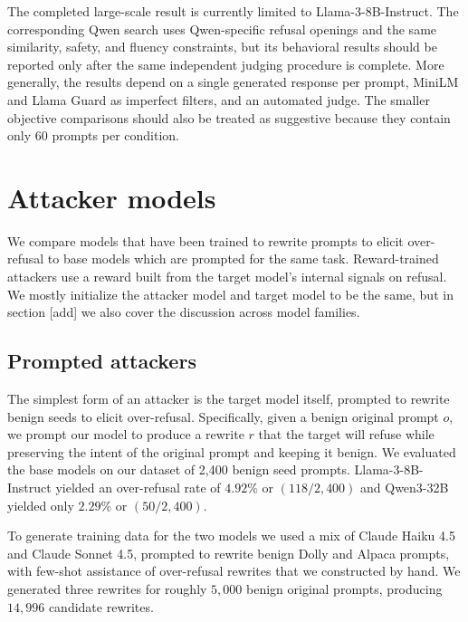 \documentclass{article}
\begin{document}
The completed large-scale result is currently limited to Llama-3-8B-Instruct. The corresponding Qwen search uses Qwen-specific refusal openings and the same similarity, safety, and fluency constraints, but its behavioral results should be reported only after the same independent judging procedure is complete. More generally, the results depend on a single generated response per prompt, MiniLM and Llama Guard as imperfect filters, and an automated judge. The smaller objective comparisons should also be treated as suggestive because they contain only 60 prompts per condition.

\section{Attacker models}
We compare models that have been trained to rewrite prompts to elicit over-refusal to base models which are prompted for the same task. Reward-trained attackers use a reward built from the target model's internal signals on refusal. We mostly initialize the attacker model and target model to be the same, but in section [add] we also cover the discussion across model families. 

\subsection{Prompted attackers}

The simplest form of an attacker is the target model itself, prompted to rewrite benign seeds to elicit over-refusal. Specifically, given a benign original prompt $o$, we prompt our model to produce a rewrite $r$ that the target will refuse while preserving the intent of the original prompt and keeping it benign. We evaluated the base models on our dataset of 2{,}400 benign seed prompts. Llama-3-8B-Instruct yielded an over-refusal rate of $4.92\%$ or $(118 / 2{,}400)$ and Qwen3-32B yielded only $2.29\%$ or $(50/2{,}400)$. 

To generate training data for the two models we used a mix of Claude Haiku 4.5 and Claude Sonnet 4.5, prompted to rewrite benign Dolly and Alpaca prompts, with few-shot assistance of over-refusal rewrites that we constructed by hand. We generated three rewrites for roughly $5{,}000$ benign original prompts, producing $14{,}996$ candidate rewrites.
\end{document}
